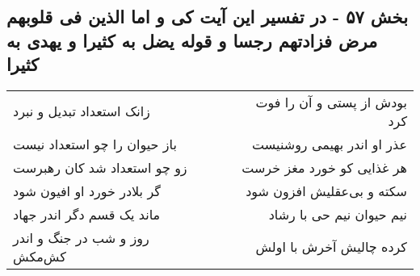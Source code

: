 \begin{center}
\section*{بخش ۵۷ - در تفسیر این آیت کی و اما الذین فی قلوبهم مرض فزادتهم رجسا و قوله یضل به کثیرا و یهدی به کثیرا}
\label{sec:sh057}
\begin{longtable}{l p{0.5cm} r}
زانک استعداد تبدیل و نبرد
&&
بودش از پستی و آن را فوت کرد
\\
باز حیوان را چو استعداد نیست
&&
عذر او اندر بهیمی روشنیست
\\
زو چو استعداد شد کان رهبرست
&&
هر غذایی کو خورد مغز خرست
\\
گر بلادر خورد او افیون شود
&&
سکته و بی‌عقلیش افزون شود
\\
ماند یک قسم دگر اندر جهاد
&&
نیم حیوان نیم حی با رشاد
\\
روز و شب در جنگ و اندر کش‌مکش
&&
کرده چالیش آخرش با اولش
\\
\end{longtable}
\end{center}
